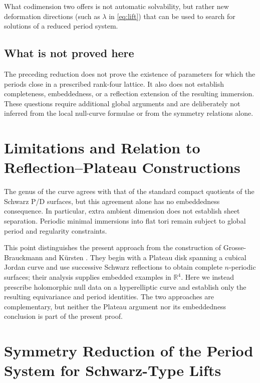 \documentclass[12pt]{article}
\numberwithin{equation}{section}
\theoremstyle{definition}
\theoremstyle{remark}
\begin{document}
What codimension two offers is not automatic solvability, but rather new deformation directions (such as $\lambda$ in \eqref{eq:lift}) that can be used to search for solutions of a reduced period system.

\subsection{What is not proved here}

The preceding reduction does not prove the existence of parameters for which the periods close in a prescribed rank-four lattice.  It also does not establish completeness, embeddedness, or a reflection extension of the resulting immersion.  These questions require additional global arguments and are deliberately not inferred from the local null-curve formulae or from the symmetry relations alone.

\section{Limitations and Relation to Reflection--Plateau Constructions}\label{sec:topology}

The genus of the curve agrees with that of the standard compact quotients of the Schwarz P/D surfaces, but this agreement alone has no embeddedness consequence.  In particular, extra ambient dimension does not establish sheet separation.  Periodic minimal immersions into flat tori remain subject to global period and regularity constraints.

This point distinguishes the present approach from the construction of Grosse-Brauckmann and Kürsten \cite{GrosseBrauckmannKuersten}.  They begin with a Plateau disk spanning a cubical Jordan curve and use successive Schwarz reflections to obtain complete $n$-periodic surfaces; their analysis supplies embedded examples in $\mathbb{R}^4$.  Here we instead prescribe holomorphic null data on a hyperelliptic curve and establish only the resulting equivariance and period identities.  The two approaches are complementary, but neither the Plateau argument nor its embeddedness conclusion is part of the present proof.

\section{Symmetry Reduction of the Period System for Schwarz-Type Lifts}\label{sec:newresult}
\end{document}

